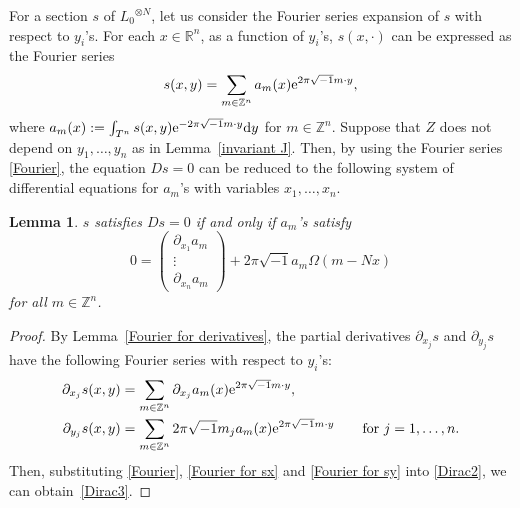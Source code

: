 \documentclass[10pt,a4paper]{amsart}
\numberwithin{equation}{section}
\newtheorem{Lemma}[Theorem]{Lemma}
\newcommand{\R}{\mathbb{R}}
\newcommand{\Z}{\mathbb{Z}}
\begin{document}
For a section $s$ of ${L_0}^{\otimes N}$, let us consider the Fourier series expansion of $s$ with respect to $y_i$'s. For each $x\in \R^n$, as a function of $y_i$'s, $s(x, \cdot )$ can be expressed as the Fourier series
\begin{equation}\label{Fourier}
s(x,y)=\sum_{m\in \Z^n}a_m(x){\rm e}^{2\pi\sqrt{-1}m\cdot y},
\end{equation}
where
$
a_m(x):=\int_{T^n}s(x,y){\rm e}^{-2\pi\sqrt{-1}m\cdot y}{\rm d}y
$
for $m\in \Z^n$. Suppose that $Z$ does not depend on $y_1, \ldots , y_n$ as in Lemma~\ref{invariant J}. Then, by using the Fourier series \eqref{Fourier}, the equation $Ds=0$ can be reduced to the following system of differential equations for $a_m$'s with variables $x_1,\ldots ,x_n$.
\begin{Lemma}
$s$ satisfies $Ds=0$ if and only if $a_m$'s satisfy
\begin{equation}\label{Dirac3}
0=
\begin{pmatrix}
\partial_{x_1}a_m\\
\vdots \\
\partial_{x_n}a_m
\end{pmatrix}
+2\pi\sqrt{-1}a_m\Omega
(m-Nx)
\end{equation}
for all $m\in \Z^n$.
\end{Lemma}
\begin{proof}
By Lemma~\ref{Fourier for derivatives}, the partial derivatives $\partial_{x_j}s$ and $\partial_{y_j}s$ have the following Fourier series with respect to $y_i$'s:
\begin{align}
\partial_{x_j}s(x,y)&=\sum_{m\in \Z^n}\partial_{x_j}a_m(x){\rm e}^{2\pi\sqrt{-1}m\cdot y},\label{Fourier for sx} \\
\partial_{y_j}s(x,y)&=\sum_{m\in \Z^n}2\pi\sqrt{-1}m_ja_m(x){\rm e}^{2\pi\sqrt{-1}m\cdot y} \qquad\text{for $j=1,\ldots , n$.}\label{Fourier for sy}
\end{align}
Then, substituting \eqref{Fourier}, \eqref{Fourier for sx} and \eqref{Fourier for sy} into \eqref{Dirac2}, we can obtain~\eqref{Dirac3}.
\end{proof}
\end{document}
